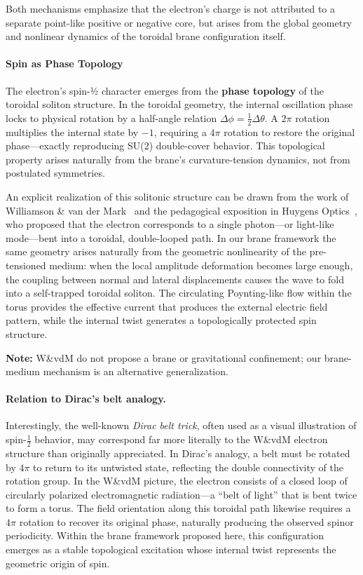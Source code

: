 Both mechanisms emphasize that the electron's charge is not attributed
to a separate point-like positive or negative core, but arises from
the global geometry and nonlinear dynamics of the toroidal brane
configuration itself.

\paragraph{Spin as Phase Topology}\label{spin-as-phase-topology}

The electron's spin-½ character emerges from the \textbf{phase topology} of the toroidal
soliton structure. In the toroidal geometry, the internal oscillation phase locks to
physical rotation by a half-angle relation $\Delta\phi = \tfrac{1}{2}\Delta\theta$.
A $2\pi$ rotation multiplies the internal state by $-1$, requiring a $4\pi$ rotation
to restore the original phase—exactly reproducing SU(2) double-cover behavior.
This topological property arises naturally from the brane's curvature-tension dynamics,
not from postulated symmetries.

An explicit realization of this solitonic structure can be drawn from
the work of Williamson \& van der Mark~\cite{Williamson1997} and the
pedagogical exposition in Huygens Optics~\cite{HuygensOptics2025}, who
proposed that the electron corresponds to a single photon---or
light-like mode---bent into a toroidal, double-looped path. In our brane
framework the same geometry arises naturally from the geometric
nonlinearity of the pre-tensioned medium: when the local amplitude
deformation becomes large enough, the coupling between normal and lateral
displacements causes the wave to fold into a self-trapped toroidal
soliton. The circulating Poynting-like flow within the torus provides
the effective current that produces the external electric field pattern,
while the internal twist generates a topologically protected spin structure.

\textbf{Note:} W\&vdM do not propose a brane or gravitational confinement; our brane-medium mechanism is an alternative generalization.

\paragraph{Relation to Dirac's belt analogy.}
Interestingly, the well-known \emph{Dirac belt trick}, often used as a visual
illustration of spin-$\tfrac12$ behavior, may correspond far more literally to
the W\&vdM electron structure than originally appreciated. In Dirac's analogy,
a belt must be rotated by $4\pi$ to return to its untwisted state, reflecting
the double connectivity of the rotation group. In the W\&vdM picture, the
electron consists of a closed loop of circularly polarized electromagnetic
radiation---a ``belt of light'' that is bent twice to form a torus. The field
orientation along this toroidal path likewise requires a $4\pi$ rotation to
recover its original phase, naturally producing the observed spinor
periodicity. Within the brane framework proposed here, this configuration
emerges as a stable topological excitation whose internal twist represents the
geometric origin of spin.

